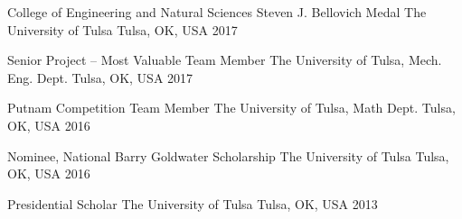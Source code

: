 \begin{cvhonors}

  \cvhonor
    {College of Engineering and Natural Sciences Steven J. Bellovich Medal} %
    {The University of Tulsa} %
    {Tulsa, OK, USA} %
    {2017} %


  \cvhonor
    {Senior Project -- Most Valuable Team Member} %
    {The University of Tulsa, Mech. Eng. Dept.} %
    {Tulsa, OK, USA} %
    {2017} %
    
\cvhonor
	{Putnam Competition Team Member} %
	{The University of Tulsa, Math Dept.} %
	{Tulsa, OK, USA} %
	{2016} %



  \cvhonor
    {Nominee, National Barry Goldwater Scholarship} %
    {The University of Tulsa} %
    {Tulsa, OK, USA} %
    {2016} %
    
\cvhonor
	{Presidential Scholar} %
	{The University of Tulsa} %
	{Tulsa, OK, USA} %
	{2013} %
\end{cvhonors}


